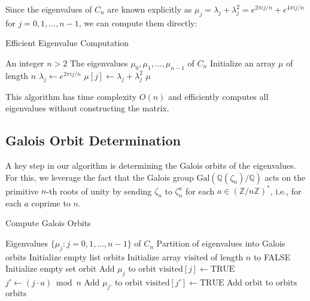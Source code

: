 Since the eigenvalues of $C_n$ are known explicitly as $\mu_j = \lambda_j + \lambda_j^2 = e^{2\pi i j/n} + e^{4\pi i j/n}$ for $j = 0, 1, \ldots, n-1$, we can compute them directly:

\begin{algorithm}
\caption{Efficient Eigenvalue Computation}
\begin{algorithmic}[1]
\REQUIRE An integer $n > 2$
\ENSURE The eigenvalues $\mu_0, \mu_1, \ldots, \mu_{n-1}$ of $C_n$
\STATE Initialize an array $\mu$ of length $n$
    \STATE $\lambda_j \gets e^{2\pi i j/n}$
    \STATE $\mu[j] \gets \lambda_j + \lambda_j^2$
\ENDFOR
\RETURN $\mu$
\end{algorithmic}
\end{algorithm}

This algorithm has time complexity $O(n)$ and efficiently computes all eigenvalues without constructing the matrix.

\subsection{Galois Orbit Determination}

A key step in our algorithm is determining the Galois orbits of the eigenvalues. For this, we leverage the fact that the Galois group $\text{Gal}(\mathbb{Q}(\zeta_n)/\mathbb{Q})$ acts on the primitive $n$-th roots of unity by sending $\zeta_n$ to $\zeta_n^a$ for each $a \in (\mathbb{Z}/n\mathbb{Z})^*$, i.e., for each $a$ coprime to $n$.

\begin{algorithm}
\caption{Compute Galois Orbits}
\begin{algorithmic}[1]
\REQUIRE Eigenvalues $\{\mu_j : j = 0, 1, \ldots, n-1\}$ of $C_n$
\ENSURE Partition of eigenvalues into Galois orbits
\STATE Initialize empty list $\text{orbits}$
\STATE Initialize array $\text{visited}$ of length $n$ to FALSE
        \STATE Initialize empty set $\text{orbit}$
        \STATE Add $\mu_j$ to $\text{orbit}$
        \STATE $\text{visited}[j] \gets \text{TRUE}$
            \STATE $j' \gets (j \cdot a) \bmod n$
                \STATE Add $\mu_{j'}$ to $\text{orbit}$
                \STATE $\text{visited}[j'] \gets \text{TRUE}$
            \ENDIF
        \ENDFOR
        \STATE Add $\text{orbit}$ to $\text{orbits}$
    \ENDIF
\ENDFOR
\RETURN $\text{orbits}$
\end{algorithmic}
\end{algorithm}

